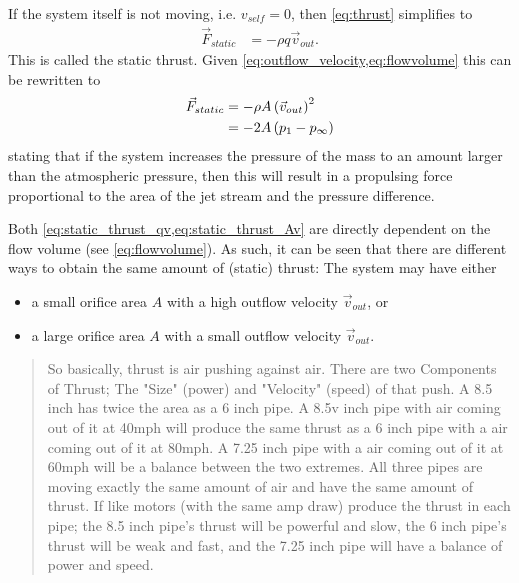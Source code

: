 
If the system itself is not moving, i.e. $v_{self} = 0$, then \cref{eq:thrust} simplifies to
%
\begin{align}
\vec{F}_{static} &= -\rho q \vec{v}_{out}.  \label{eq:static_thrust_qv}
\end{align}
%
This is called the static thrust. 
Given \cref{eq:outflow_velocity,eq:flowvolume} this can be rewritten to
%
\begin{align}
\vec{F}_{static} &= -\rho A \left(\vec{v}_{out}\right)^2 \label{eq:static_thrust_Av} \\
				 &= -2A \left( p_1 - p_\infty \right)
\end{align}
%
stating that if the system increases the pressure of the mass to an amount
larger than the atmospheric pressure, then this will result in a propulsing
force proportional to the area of the jet stream and the pressure difference.

Both \cref{eq:static_thrust_qv,eq:static_thrust_Av} are directly dependent on
the flow volume (see \cref{eq:flowvolume}). As such, it can be seen that there are
different ways to obtain the same amount of (static) thrust: The system may have either

\begin{itemize}
	\item a small orifice area $A$ with a high outflow velocity $\vec{v}_{out}$, or
	\item a large orifice area $A$ with a small outflow velocity $\vec{v}_{out}$.
\end{itemize}


\begin{quote}
So basically, thrust is air pushing against air. There are two Components of Thrust; The "Size" (power) and "Velocity" (speed) of that push. A 8.5 inch has twice the area as a 6 inch pipe. A 8.5v inch pipe with air coming out of it at 40mph will produce the same thrust as a 6 inch pipe with a air coming out of it at 80mph. A 7.25 inch pipe with a air coming out of it at 60mph will be a balance between the two extremes. All three pipes are moving exactly the same amount of air and have the same amount of thrust. If like motors (with the same amp draw) produce the thrust in each pipe; the 8.5 inch pipe’s thrust will be powerful and slow, the 6 inch pipe’s thrust will be weak and fast, and the 7.25 inch pipe will have a balance of power and speed.
\end{quote}

